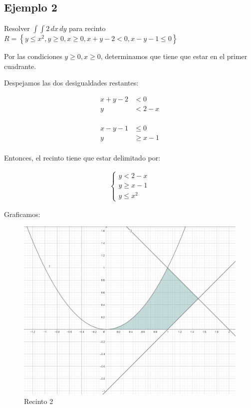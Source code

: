\subsection{Ejemplo 2}

Resolver \(\int\!\int2\,dx\,dy\) para recinto \(R = \left\{y\leq x^{2}, y\geq0, x\geq0, x+y-2<0, x-y-1\leq0\right\}\)

Por las condiciones \(y\geq0, x\geq0\),
determinamos que tiene que estar en el primer cuadrante.

Despejamos las dos desigualdades restantes:

\begin{align*}
    x+y-2 & < 0   \\
    y     & < 2-x \\
\end{align*}

\begin{align*}
    x-y-1 & \leq 0   \\
    y     & \geq x-1 \\
\end{align*}

Entonces, el recinto tiene que estar delimitado por:

\begin{align*}
    \begin{cases}
        y     < 2-x \\
        y \geq x-1  \\
        y\leq x^{2}
    \end{cases}
\end{align*}

Graficamos:

\begin{figure}[H]
    \centering
    \includegraphics[scale=.5]{./img/02-recinto2.png}
    \caption{Recinto 2}
\end{figure}

